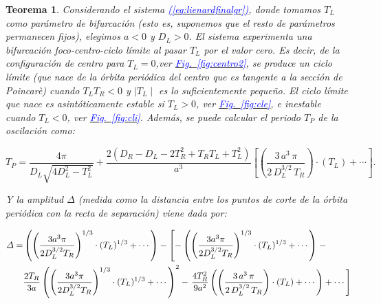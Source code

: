\documentclass[12pt,a4paper]{report} %
\newtheorem{theorem}{Teorema}[chapter]
\newcommand{\fref}[1]{\hyperref[#1]{\textcolor{blue}{Fig.~\ref*{#1}}}}
\newcommand{\eref}[1]{\hyperref[#1]{\textcolor{blue}{(\ref*{#1})}}}
\begin{document}
	\begin{theorem}
		\label{teo:5.1}
		Considerando el sistema \eref{eq:lienardfinalgr}, donde tomamos $T_L$ como parámetro de bifurcación (esto es, suponemos que el resto de parámetros permanecen fijos), elegimos $a<0$ y $D_L>0$. El sistema experimenta una bifurcación foco-centro-ciclo límite al pasar $T_L$ por el valor cero. Es decir, de la configuración de centro para $T_L=0$,ver \fref{fig:centro2}, se produce un ciclo límite (que nace de la órbita periódica del centro que es tangente a la sección de Poincarè) cuando $T_L T_R<0$ y $\mid T_L \mid$ es lo suficientemente pequeño. El ciclo límite que nace es asintóticamente estable si $T_L>0$, ver \fref{fig:cle}, e inestable cuando $T_L<0$, ver \fref{fig:cli}. Además, se puede calcular el periodo $T_P$ de la oscilación como:
		
		\begin{equation}
			\label{eq:tperiodo}
			T_P= \frac{4\pi}{D_L\sqrt{4D_L^2-T_L^2}}+\frac{2(D_R-D_L-2T_R^2+T_RT_L+T_L^2)}{a^3}\left[\left( \frac{3\, a^3 \, \pi}{2\, D_L^{3/2}\, T_R} \right)\cdot \left(T_L\right)+\cdots\right].
		\end{equation}\smallskip
		
		\noindent Y la amplitud $\varDelta$ (medida como la distancia entre los puntos de corte de la órbita periódica con la recta de separación) viene dada por:
		
		\begin{equation}
			\label{eq:amplitu}
			\scalebox{0.95}{$\displaystyle
				\begin{split}
					\varDelta = &\left( \left( \frac{3a^3 \pi}{2D_L^{3/2}T_R} \right)^{1/3} \cdot (T_L)^{1/3} + \cdots \right) - \left[ -\left( \left( \frac{3a^3 \pi}{2D_L^{3/2}T_R} \right)^{1/3} \cdot (T_L)^{1/3} + \cdots \right) \right.-\\
					&\frac{2T_R}{3a} \left( \left( \frac{3a^3 \pi}{2D_L^{3/2}T_R} \right)^{1/3} \cdot (T_L)^{1/3} + \cdots \right)^2 - \left. \frac{4T_R^2}{9a^2} \left( \left( \frac{3\, a^3 \, \pi}{2\, D_L^{3/2}\, T_R} \right)\cdot \left(T_L\right)+\cdots \right) + \cdots \right]
				\end{split}
				$}
		\end{equation}
	\end{theorem}
	
	\newpage
	
\end{document}
